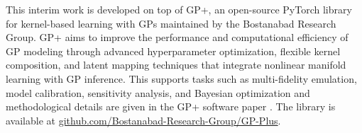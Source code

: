 \documentclass[11pt]{article}
\begin{document}
This interim work is developed on top of GP+, an open-source PyTorch library for
kernel-based learning with GPs maintained by the Bostanabad Research Group.
GP+ aims to improve the performance and computational efficiency of GP modeling through advanced
hyperparameter optimization, flexible kernel composition, and latent mapping techniques that
integrate nonlinear manifold learning with GP inference. This supports tasks such as multi-fidelity
emulation, model calibration, sensitivity analysis, and Bayesian optimization and methodological details are given in the GP+ software paper
\citep{yousefpour2024gpplus}.
The library is available at
\href{https://github.com/Bostanabad-Research-Group/GP-Plus}{github.com/Bostanabad-Research-Group/GP-Plus}.



\end{document}
